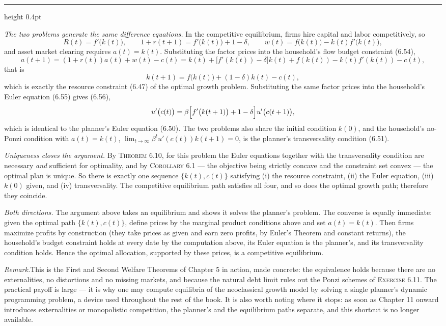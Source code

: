 \documentclass[11pt,letterpaper,reqno]{amsart}
\makeatletter
\newcommand{\as@head}[3]{%
  \par\addvspace{1.6ex}\penalty-200\relax
  \phantomsection
  \addcontentsline{toc}{subsection}{#1 #2\texorpdfstring{\ifx\relax#3\relax\else\quad #3\fi}{}}%
  {\color{RuleGrey}\hrule height 0.4pt}%
  \nobreak\vspace{0.8ex}\nobreak
  \noindent{\bfseries #1 #2}%
  \ifx\relax#3\relax\else\quad{\bfseries\itshape #3}\fi
  \par\nobreak\vspace{0.4ex}\nobreak
  \as@beginstatement
}
\newcommand{\as@beginstatement}{\begingroup\itshape\ignorespaces}
\newenvironment{aex}[2]{\as@head{Exercise}{#1}{#2}}{\par\addvspace{1.2ex}}
\newcommand{\rmk}[1]{%
  \par\vspace{0.6ex}%
  {\small\noindent\textit{Remark.}\hspace{0.5em}#1\par}%
  \vspace{0.4ex}%
}
\newcommand{\bk}[1]{\textup{\textsc{#1}}}
\renewcommand{\as@beginstatement}{\ignorespaces}
\makeatother
\begin{document}
\begin{aex}{6.21}{}
\emph{The two problems generate the same difference equations.}  In the competitive equilibrium, firms hire
capital and labor competitively, so
\[
R(t)=f'\bigl(k(t)\bigr),
\qquad
1+r(t+1)=f'\bigl(k(t)\bigr)+1-\delta,
\qquad
w(t)=f\bigl(k(t)\bigr)-k(t)f'\bigl(k(t)\bigr),
\]
and asset market clearing requires $a(t)=k(t)$.  Substituting the factor prices into the household's flow
budget constraint \bk{(6.54)},
\[
a(t+1)=(1+r(t))a(t)+w(t)-c(t)
=k(t)+\bigl[f'(k(t))-\delta\bigr]k(t)+f(k(t))-k(t)f'(k(t))-c(t),
\]
that is
\[
k(t+1)=f\bigl(k(t)\bigr)+(1-\delta)k(t)-c(t) ,
\]
which is exactly the resource constraint \bk{(6.47)} of the optimal growth problem.  Substituting the same
factor prices into the household's Euler equation \bk{(6.55)} gives \bk{(6.56)},
\[
u'\bigl(c(t)\bigr)=\beta\Bigl[f'\bigl(k(t+1)\bigr)+1-\delta\Bigr]u'\bigl(c(t+1)\bigr),
\]
which is identical to the planner's Euler equation \bk{(6.50)}.  The two problems also share the initial
condition $k(0)$, and the household's no-Ponzi condition with $a(t)=k(t)$,
$\lim_{t\to\infty}\beta^{t}u'(c(t))k(t+1)=0$, is the planner's transversality condition \bk{(6.51)}.

\emph{Uniqueness closes the argument.}  By \bk{Theorem 6.10}, for this problem the Euler equations together
with the transversality condition are necessary \emph{and} sufficient for optimality, and by
\bk{Corollary 6.1} --- the objective being strictly concave and the constraint set convex --- the optimal
plan is unique.  So there is exactly one sequence $\{k(t),c(t)\}$ satisfying (i) the resource constraint,
(ii) the Euler equation, (iii) $k(0)$ given, and (iv) transversality.  The competitive equilibrium path
satisfies all four, and so does the optimal growth path; therefore they coincide.

\emph{Both directions.}  The argument above takes an equilibrium and shows it solves the planner's problem.
The converse is equally immediate: given the optimal path $\{k(t),c(t)\}$, define prices by the marginal
product conditions above and set $a(t)=k(t)$.  Then firms maximize profits by construction (they take
prices as given and earn zero profits, by Euler's Theorem and constant returns), the household's budget
constraint holds at every date by the computation above, its Euler equation is the planner's, and its
transversality condition holds.  Hence the optimal allocation, supported by these prices, is a competitive
equilibrium.

\rmk{This is the First and Second Welfare Theorems of Chapter 5 in action, made concrete: the equivalence
holds because there are no externalities, no distortions and no missing markets, and because the natural
debt limit rules out the Ponzi schemes of \bk{Exercise 6.11}.  The practical payoff is large --- it is why
one may compute equilibria of the neoclassical growth model by solving a single planner's dynamic
programming problem, a device used throughout the rest of the book.  It is also worth noting where it
stops: as soon as Chapter 11 onward introduces externalities or monopolistic competition, the planner's and
the equilibrium paths separate, and this shortcut is no longer available.}
\end{aex}
\end{document}
